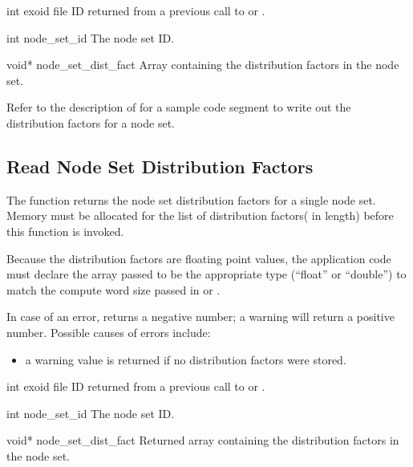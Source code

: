 
\begin{parameters}
\item[{int exoid \R{}}]
\exo{} file ID returned from a previous call to  or
.

\item[{int node_set_id \R{}}]
The node set ID.

\item[{void* node_set_dist_fact \R{}}]
Array containing the distribution factors in the node set.
\end{parameters}

Refer to the description of  for a
sample code segment to write out the distribution factors for a node
set.


\subsection{Read Node Set Distribution Factors}

The function  returns the node
set distribution factors for a single node set. Memory must be
allocated for the list of distribution factors(
in length) before this function is invoked.


Because the distribution factors are floating point values, the
application code must declare the array passed to be the appropriate
type (``float'' or ``double'') to match the compute word size passed
in  or .


In case of an error,  returns a
negative number; a warning will return a positive number. Possible
causes of errors include:

\begin{itemize}
 \item a warning value is returned if no distribution factors 
were stored.
\end{itemize}


\begin{parameters}
\item[{int exoid \R{}}]
\exo{} file ID returned from a previous call to  
or .

\item[{int node_set_id \R{}}]
The node set ID.

\item[{void* node_set_dist_fact \W{}}]
Returned array containing the distribution factors in the node set.
\end{parameters}

